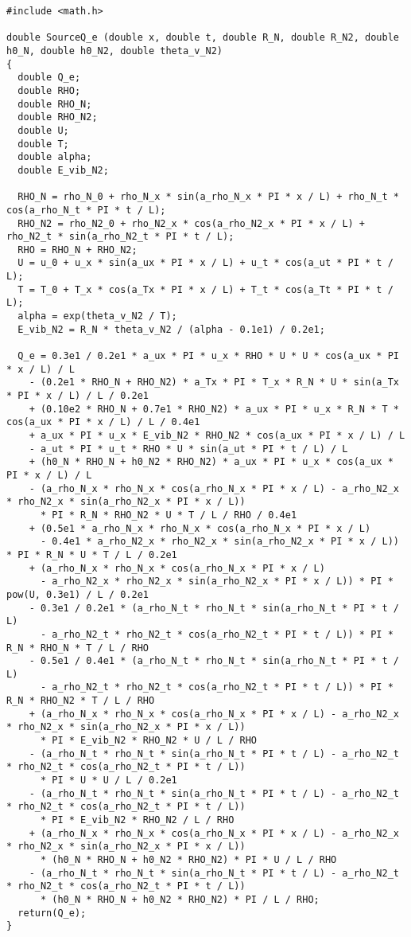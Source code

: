 \documentclass[10pt]{article}
\begin{document}
\begin{footnotesize}  
\begin{verbatim}
#include <math.h>

double SourceQ_e (double x, double t, double R_N, double R_N2, double h0_N, double h0_N2, double theta_v_N2)
{
  double Q_e;
  double RHO;
  double RHO_N;
  double RHO_N2;
  double U;
  double T;
  double alpha;
  double E_vib_N2;

  RHO_N = rho_N_0 + rho_N_x * sin(a_rho_N_x * PI * x / L) + rho_N_t * cos(a_rho_N_t * PI * t / L);
  RHO_N2 = rho_N2_0 + rho_N2_x * cos(a_rho_N2_x * PI * x / L) + rho_N2_t * sin(a_rho_N2_t * PI * t / L);
  RHO = RHO_N + RHO_N2;
  U = u_0 + u_x * sin(a_ux * PI * x / L) + u_t * cos(a_ut * PI * t / L);
  T = T_0 + T_x * cos(a_Tx * PI * x / L) + T_t * cos(a_Tt * PI * t / L);
  alpha = exp(theta_v_N2 / T);
  E_vib_N2 = R_N * theta_v_N2 / (alpha - 0.1e1) / 0.2e1;

  Q_e = 0.3e1 / 0.2e1 * a_ux * PI * u_x * RHO * U * U * cos(a_ux * PI * x / L) / L
    - (0.2e1 * RHO_N + RHO_N2) * a_Tx * PI * T_x * R_N * U * sin(a_Tx * PI * x / L) / L / 0.2e1
    + (0.10e2 * RHO_N + 0.7e1 * RHO_N2) * a_ux * PI * u_x * R_N * T * cos(a_ux * PI * x / L) / L / 0.4e1
    + a_ux * PI * u_x * E_vib_N2 * RHO_N2 * cos(a_ux * PI * x / L) / L
    - a_ut * PI * u_t * RHO * U * sin(a_ut * PI * t / L) / L
    + (h0_N * RHO_N + h0_N2 * RHO_N2) * a_ux * PI * u_x * cos(a_ux * PI * x / L) / L
    - (a_rho_N_x * rho_N_x * cos(a_rho_N_x * PI * x / L) - a_rho_N2_x * rho_N2_x * sin(a_rho_N2_x * PI * x / L))
      * PI * R_N * RHO_N2 * U * T / L / RHO / 0.4e1
    + (0.5e1 * a_rho_N_x * rho_N_x * cos(a_rho_N_x * PI * x / L)
      - 0.4e1 * a_rho_N2_x * rho_N2_x * sin(a_rho_N2_x * PI * x / L)) * PI * R_N * U * T / L / 0.2e1
    + (a_rho_N_x * rho_N_x * cos(a_rho_N_x * PI * x / L)
      - a_rho_N2_x * rho_N2_x * sin(a_rho_N2_x * PI * x / L)) * PI * pow(U, 0.3e1) / L / 0.2e1
    - 0.3e1 / 0.2e1 * (a_rho_N_t * rho_N_t * sin(a_rho_N_t * PI * t / L)
      - a_rho_N2_t * rho_N2_t * cos(a_rho_N2_t * PI * t / L)) * PI * R_N * RHO_N * T / L / RHO
    - 0.5e1 / 0.4e1 * (a_rho_N_t * rho_N_t * sin(a_rho_N_t * PI * t / L)
      - a_rho_N2_t * rho_N2_t * cos(a_rho_N2_t * PI * t / L)) * PI * R_N * RHO_N2 * T / L / RHO
    + (a_rho_N_x * rho_N_x * cos(a_rho_N_x * PI * x / L) - a_rho_N2_x * rho_N2_x * sin(a_rho_N2_x * PI * x / L))
      * PI * E_vib_N2 * RHO_N2 * U / L / RHO
    - (a_rho_N_t * rho_N_t * sin(a_rho_N_t * PI * t / L) - a_rho_N2_t * rho_N2_t * cos(a_rho_N2_t * PI * t / L))
      * PI * U * U / L / 0.2e1
    - (a_rho_N_t * rho_N_t * sin(a_rho_N_t * PI * t / L) - a_rho_N2_t * rho_N2_t * cos(a_rho_N2_t * PI * t / L))
      * PI * E_vib_N2 * RHO_N2 / L / RHO
    + (a_rho_N_x * rho_N_x * cos(a_rho_N_x * PI * x / L) - a_rho_N2_x * rho_N2_x * sin(a_rho_N2_x * PI * x / L))
      * (h0_N * RHO_N + h0_N2 * RHO_N2) * PI * U / L / RHO
    - (a_rho_N_t * rho_N_t * sin(a_rho_N_t * PI * t / L) - a_rho_N2_t * rho_N2_t * cos(a_rho_N2_t * PI * t / L))
      * (h0_N * RHO_N + h0_N2 * RHO_N2) * PI / L / RHO;
  return(Q_e);
}
\end{verbatim}
\end{footnotesize}
\end{document}
